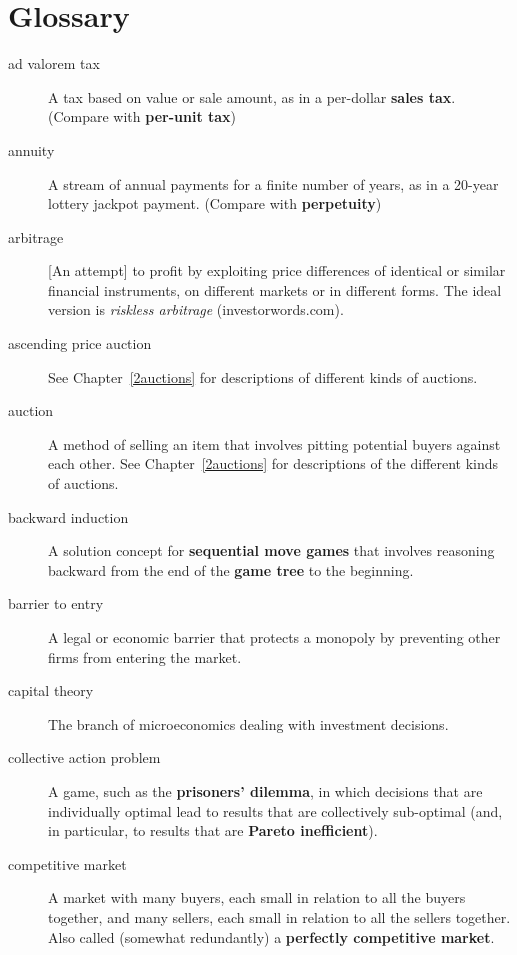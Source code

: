 \chapter{Glossary}

\begin{description}

\item[ad valorem tax] A tax based on value or sale amount, as in a per-dollar \textbf{sales tax}. (Compare with \textbf{per-unit tax})

\item[annuity] A stream of annual payments for a finite number of years, as in a 20-year lottery jackpot payment. (Compare with \textbf{perpetuity})

\item[arbitrage] [An attempt] to profit by exploiting price differences of identical or similar financial instruments, on different markets or in different forms. The ideal version is \emph{riskless arbitrage} (investorwords.com).

\item[ascending price auction] See Chapter~\ref{2auctions} for descriptions of different kinds of auctions.

\item[auction] A method of selling an item that involves pitting potential buyers against each other. See Chapter~\ref{2auctions} for descriptions of the different kinds of auctions.

\item[backward induction] A solution concept for \textbf{sequential move games} that involves reasoning backward from the end of the \textbf{game tree} to the beginning.

\item[barrier to entry] A legal or economic barrier that protects a monopoly by preventing other firms from entering the market.

\item[capital theory] The branch of microeconomics dealing with investment decisions.

\item[collective action problem] A game, such as the \textbf{prisoners' dilemma}, in which decisions that are individually optimal lead to results that are collectively sub-optimal (and, in particular, to results that are \textbf{Pareto inefficient}).

\item[competitive market] A market with many buyers, each small in relation to all the buyers together, and many sellers, each small in relation to all the sellers together. Also called (somewhat redundantly) a \textbf{perfectly competitive market}. 


\end{description}
